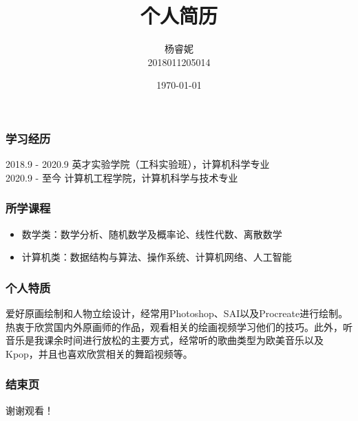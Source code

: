 \documentclass{beamer}
\begin{document}
\title{个人简历}%
\author{杨睿妮\\2018011205014} 
\date{\today}%
\begin{frame}
\titlepage %
\end{frame}
\begin{frame}
\frametitle{学习经历} %
2018.9 - 2020.9 英才实验学院（工科实验班），计算机科学专业 \\
2020.9 - 至今 计算机工程学院，计算机科学与技术专业
\end{frame}
\begin{frame}
\frametitle{所学课程} %
\begin{itemize}
    \item 数学类：数学分析、随机数学及概率论、线性代数、离散数学
    \item 计算机类：数据结构与算法、操作系统、计算机网络、人工智能
    \end{itemize}

\end{frame}

\begin{frame}
    \frametitle{个人特质} %
    \qquad 爱好原画绘制和人物立绘设计，经常用Photoshop、SAI以及Procreate进行绘制。热衷于欣赏国内外原画师的作品，观看相关的绘画视频学习他们的技巧。此外，听音乐是我课余时间进行放松的主要方式，经常听的歌曲类型为欧美音乐以及Kpop，并且也喜欢欣赏相关的舞蹈视频等。
    
\end{frame}

\begin{frame}
    \frametitle{结束页}
    \begin{center}
        谢谢观看！
    \end{center}
    
    
\end{frame}
\end{document}
